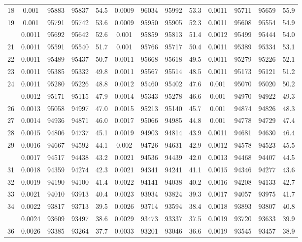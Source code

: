 \documentclass[
  14pt,
]{article}
\begin{document}
\begin{longtable}[t]{lcccccccccccc}
18 & 0.001 & 95883 & 95837 & 54.5 & 0.0009 & 96034 & 95992 & 53.3 & 0.0011 & 95711 & 95659 & 55.9\\
19 & 0.001 & 95791 & 95742 & 53.6 & 0.0009 & 95950 & 95905 & 52.3 & 0.0011 & 95608 & 95554 & 54.9\\
\addlinespace
20 & 0.0011 & 95692 & 95642 & 52.6 & 0.001 & 95859 & 95813 & 51.4 & 0.0012 & 95499 & 95444 & 54.0\\
21 & 0.0011 & 95591 & 95540 & 51.7 & 0.001 & 95766 & 95717 & 50.4 & 0.0011 & 95389 & 95334 & 53.1\\
22 & 0.0011 & 95489 & 95437 & 50.7 & 0.0011 & 95668 & 95618 & 49.5 & 0.0011 & 95279 & 95226 & 52.1\\
23 & 0.0011 & 95385 & 95332 & 49.8 & 0.0011 & 95567 & 95514 & 48.5 & 0.0011 & 95173 & 95121 & 51.2\\
24 & 0.0011 & 95280 & 95226 & 48.8 & 0.0012 & 95460 & 95402 & 47.6 & 0.001 & 95070 & 95020 & 50.2\\
\addlinespace
25 & 0.0012 & 95171 & 95115 & 47.9 & 0.0014 & 95343 & 95278 & 46.6 & 0.001 & 94970 & 94922 & 49.3\\
26 & 0.0013 & 95058 & 94997 & 47.0 & 0.0015 & 95213 & 95140 & 45.7 & 0.001 & 94874 & 94826 & 48.3\\
27 & 0.0014 & 94936 & 94871 & 46.0 & 0.0017 & 95066 & 94985 & 44.8 & 0.001 & 94778 & 94729 & 47.4\\
28 & 0.0015 & 94806 & 94737 & 45.1 & 0.0019 & 94903 & 94814 & 43.9 & 0.0011 & 94681 & 94630 & 46.4\\
29 & 0.0016 & 94667 & 94592 & 44.1 & 0.002 & 94726 & 94631 & 42.9 & 0.0012 & 94578 & 94523 & 45.5\\
\addlinespace
30 & 0.0017 & 94517 & 94438 & 43.2 & 0.0021 & 94536 & 94439 & 42.0 & 0.0013 & 94468 & 94407 & 44.5\\
31 & 0.0018 & 94359 & 94274 & 42.3 & 0.0021 & 94341 & 94241 & 41.1 & 0.0015 & 94346 & 94277 & 43.6\\
32 & 0.0019 & 94190 & 94100 & 41.4 & 0.0022 & 94141 & 94038 & 40.2 & 0.0016 & 94208 & 94133 & 42.7\\
33 & 0.0021 & 94010 & 93913 & 40.4 & 0.0023 & 93934 & 93824 & 39.3 & 0.0017 & 94057 & 93975 & 41.7\\
34 & 0.0022 & 93817 & 93713 & 39.5 & 0.0026 & 93714 & 93594 & 38.4 & 0.0018 & 93893 & 93807 & 40.8\\
\addlinespace
35 & 0.0024 & 93609 & 93497 & 38.6 & 0.0029 & 93473 & 93337 & 37.5 & 0.0019 & 93720 & 93633 & 39.9\\
36 & 0.0026 & 93385 & 93264 & 37.7 & 0.0033 & 93201 & 93046 & 36.6 & 0.0019 & 93545 & 93457 & 38.9\\

\end{longtable}
\end{document}
